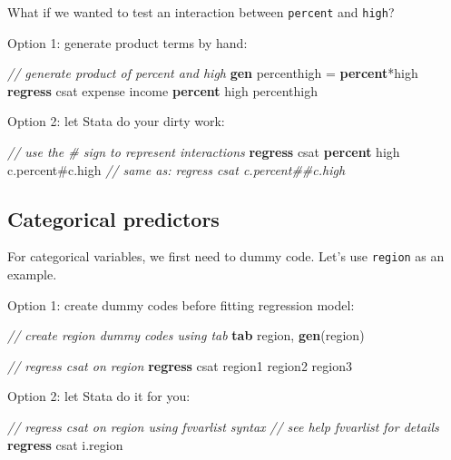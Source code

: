 \documentclass[
]{book}
\newenvironment{Shaded}{\begin{snugshade}}{\end{snugshade}}
\newcommand{\CommentTok}[1]{\textcolor[rgb]{0.56,0.35,0.01}{\textit{#1}}}
\newcommand{\KeywordTok}[1]{\textcolor[rgb]{0.13,0.29,0.53}{\textbf{#1}}}
\newcommand{\NormalTok}[1]{#1}
\begin{document}
What if we wanted to test an interaction between \texttt{percent} and \texttt{high}?

Option 1: generate product terms by hand:

\begin{Shaded}
\begin{Highlighting}[]
\CommentTok{// generate product of percent and high}
\KeywordTok{gen}\NormalTok{ percenthigh = }\KeywordTok{percent}\NormalTok{*high }
\KeywordTok{regress}\NormalTok{ csat expense income }\KeywordTok{percent}\NormalTok{ high percenthigh}
\end{Highlighting}
\end{Shaded}

Option 2: let Stata do your dirty work:

\begin{Shaded}
\begin{Highlighting}[]
\CommentTok{// use the \# sign to represent interactions }
\KeywordTok{regress}\NormalTok{ csat }\KeywordTok{percent}\NormalTok{ high c.percent\#c.high}
\CommentTok{// same as: regress csat c.percent\#\#c.high}
\end{Highlighting}
\end{Shaded}

\hypertarget{categorical-predictors}{%
\subsection{Categorical predictors}\label{categorical-predictors}}

For categorical variables, we first need to dummy code. Let's use \texttt{region} as an example.

Option 1: create dummy codes before fitting regression model:

\begin{Shaded}
\begin{Highlighting}[]
\CommentTok{// create region dummy codes using tab }
\KeywordTok{tab}\NormalTok{ region, }\KeywordTok{gen}\NormalTok{(region)}

\CommentTok{// regress csat on region}
\KeywordTok{regress}\NormalTok{ csat region1 region2 region3}
\end{Highlighting}
\end{Shaded}

Option 2: let Stata do it for you:

\begin{Shaded}
\begin{Highlighting}[]
\CommentTok{// regress csat on region using fvvarlist syntax}
\CommentTok{// see \textasciigrave{}help fvvarlist\textasciigrave{} for details}
\KeywordTok{regress}\NormalTok{ csat i.region}
\end{Highlighting}
\end{Shaded}
\end{document}

